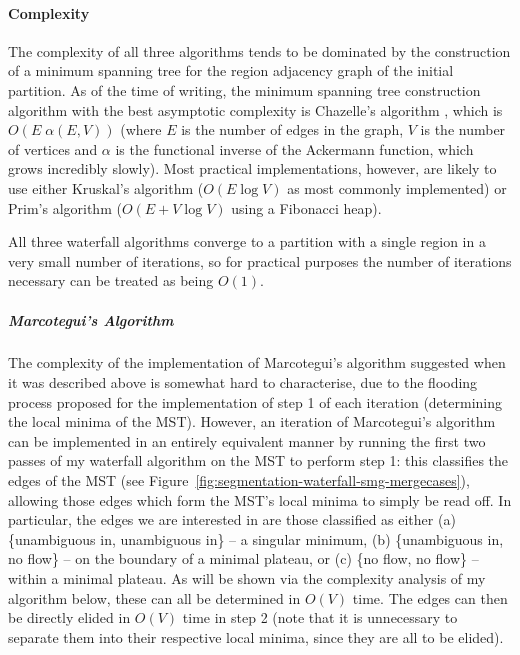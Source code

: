 \paragraph{Complexity}

The complexity of all three algorithms tends to be dominated by the construction of a minimum spanning tree for the region adjacency graph of the initial partition. As of the time of writing, the minimum spanning tree construction algorithm with the best asymptotic complexity is Chazelle's algorithm \cite{chazelle00}, which is $O(E \; \alpha(E,V))$ (where $E$ is the number of edges in the graph, $V$ is the number of vertices and $\alpha$ is the functional inverse of the Ackermann function, which grows incredibly slowly). Most practical implementations, however, are likely to use either Kruskal's algorithm ($O(E \log V)$ as most commonly implemented) or Prim's algorithm ($O(E + V \log V)$ using a Fibonacci heap).

All three waterfall algorithms converge to a partition with a single region in a very small number of iterations, so for practical purposes the number of iterations necessary can be treated as being $O(1)$.

\subparagraph{Marcotegui's Algorithm}

The complexity of the implementation of Marcotegui's algorithm suggested when it was described above is somewhat hard to characterise, due to the flooding process proposed for the implementation of step 1 of each iteration (determining the local minima of the MST). However, an iteration of Marcotegui's algorithm can be implemented in an entirely equivalent manner by running the first two passes of my waterfall algorithm on the MST to perform step 1: this classifies the edges of the MST (see Figure~\ref{fig:segmentation-waterfall-smg-mergecases}), allowing those edges which form the MST's local minima to simply be read off. In particular, the edges we are interested in are those classified as either (a) \{unambiguous in, unambiguous in\} -- a singular minimum, (b) \{unambiguous in, no flow\} -- on the boundary of a minimal plateau, or (c) \{no flow, no flow\} -- within a minimal plateau. As will be shown via the complexity analysis of my algorithm below, these can all be determined in $O(V)$ time. The edges can then be directly elided in $O(V)$ time in step 2 (note that it is unnecessary to separate them into their respective local minima, since they are all to be elided).

